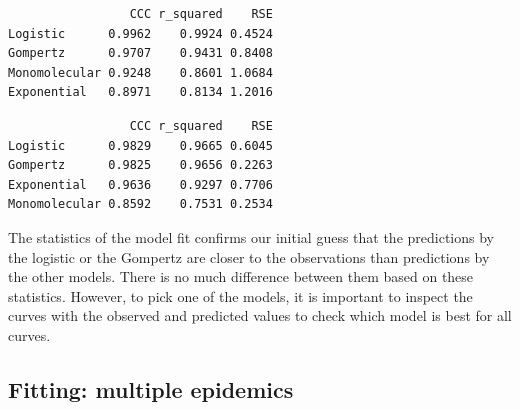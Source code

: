\documentclass[
  letterpaper,
  DIV=11,
  numbers=noendperiod]{scrreprt}
\newenvironment{Shaded}{\begin{snugshade}}{\end{snugshade}}
\newcommand{\AttributeTok}[1]{\textcolor[rgb]{0.40,0.45,0.13}{#1}}
\newcommand{\FunctionTok}[1]{\textcolor[rgb]{0.28,0.35,0.67}{#1}}
\newcommand{\NormalTok}[1]{\textcolor[rgb]{0.00,0.23,0.31}{#1}}
\newcommand{\OtherTok}[1]{\textcolor[rgb]{0.00,0.23,0.31}{#1}}
\newcommand{\SpecialCharTok}[1]{\textcolor[rgb]{0.37,0.37,0.37}{#1}}
\newcommand{\StringTok}[1]{\textcolor[rgb]{0.13,0.47,0.30}{#1}}
\begin{document}
\begin{Shaded}
\end{Shaded}

\begin{verbatim}
                 CCC r_squared    RSE
Logistic      0.9962    0.9924 0.4524
Gompertz      0.9707    0.9431 0.8408
Monomolecular 0.9248    0.8601 1.0684
Exponential   0.8971    0.8134 1.2016
\end{verbatim}

\begin{Shaded}
\end{Shaded}

\begin{verbatim}
                 CCC r_squared    RSE
Logistic      0.9829    0.9665 0.6045
Gompertz      0.9825    0.9656 0.2263
Exponential   0.9636    0.9297 0.7706
Monomolecular 0.8592    0.7531 0.2534
\end{verbatim}

The statistics of the model fit confirms our initial guess that the
predictions by the logistic or the Gompertz are closer to the
observations than predictions by the other models. There is no much
difference between them based on these statistics. However, to pick one
of the models, it is important to inspect the curves with the observed
and predicted values to check which model is best for all curves.

\hypertarget{fitting-multiple-epidemics}{%
\subsection{Fitting: multiple
epidemics}\label{fitting-multiple-epidemics}}
\end{document}
